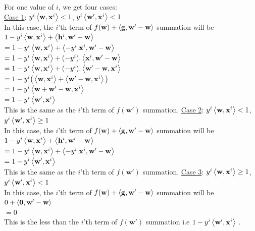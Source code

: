 \documentclass[a4paper,11pt]{article}
\begin{document}
\begin{mlsolution}
For one value of $i$, we get four cases:
\\\underline{Case 1}: $y^i \left\langle{\mathbf{w}},{\mathbf{x}^i}\right\rangle < 1$, $y^i \left\langle{\mathbf{w'}},{\mathbf{x}^i}\right\rangle < 1$
\\In this case, the $i$'th term of $f(\mathbf{w}) + \left\langle{\mathbf{g}},{\mathbf{w'-w}}\right\rangle$ summation will be
\\ $1 - y^i \left\langle{\mathbf{w}},{\mathbf{x}^i}\right\rangle + \left\langle{\mathbf{h}^i},{\mathbf{w'-w}}\right\rangle  $
\\ $ = 1 - y^i \left\langle{\mathbf{w}},{\mathbf{x}^i}\right\rangle + \left\langle{-y^i . \mathbf{x}^i },{\mathbf{w'-w}}\right\rangle  $
\\ $ = 1 - y^i \left\langle{\mathbf{w}},{\mathbf{x}^i}\right\rangle +( -y^i) . \left\langle{\mathbf{x}^i },{\mathbf{w'-w}}\right\rangle  $
\\ $ = 1 - y^i \left\langle{\mathbf{w}},{\mathbf{x}^i}\right\rangle + (-y^i) . \left\langle{\mathbf{w'-w}},{\mathbf{x}^i}\right\rangle  $
\\ $ = 1 - y^i\big( \left\langle{\mathbf{w}},{\mathbf{x}^i}\right\rangle + \left\langle{\mathbf{w'-w}},{\mathbf{x}^i}\right\rangle\big)  $
\\ $ = 1 - y^i\left\langle{\mathbf{w+w'-w}},{\mathbf{x}^i}\right\rangle$
\\ $ = 1 - y^i\left\langle{\mathbf{w'}},{\mathbf{x}^i}\right\rangle $
\\This is the same as the $i$'th term of $f(\mathbf{w'})$ summation.\newline\newline
\underline{Case 2}: $y^i \left\langle{\mathbf{w}},{\mathbf{x}^i}\right\rangle < 1$, $y^i \left\langle{\mathbf{w'}},{\mathbf{x}^i}\right\rangle \geq 1$
\\In this case, the $i$'th term of $f(\mathbf{w}) + \left\langle{\mathbf{g}},{\mathbf{w'-w}}\right\rangle$ summation will be
\\ $1 - y^i \left\langle{\mathbf{w}},{\mathbf{x}^i}\right\rangle + \left\langle{\mathbf{h}^i},{\mathbf{w'-w}}\right\rangle  $
\\ $ = 1 - y^i \left\langle{\mathbf{w}},{\mathbf{x}^i}\right\rangle + \left\langle{-y^i . \mathbf{x}^i },{\mathbf{w'-w}}\right\rangle  $
\\ $ = 1 - y^i\left\langle{\mathbf{w'}},{\mathbf{x}^i}\right\rangle $
\\This is the same as the $i$'th term of $f(\mathbf{w'})$ summation.\newline\newline
\underline{Case 3}: $y^i \left\langle{\mathbf{w}},{\mathbf{x}^i}\right\rangle \geq 1$, $y^i \left\langle{\mathbf{w'}},{\mathbf{x}^i}\right\rangle < 1$
\\In this case, the $i$'th term of $f(\mathbf{w}) + \left\langle{\mathbf{g}},{\mathbf{w'-w}}\right\rangle$ summation will be
\\ $0 + \left\langle{\mathbf{0}},{\mathbf{w'-w}}\right\rangle  $
\\ $ = 0$
\\This is the less than the $i$'th term of $f(\mathbf{w'})$ summation i.e $1 - y^i \left\langle{\mathbf{w'}},{\mathbf{x}^i}\right\rangle$ .\newline\newline

\end{mlsolution}
\end{document}
